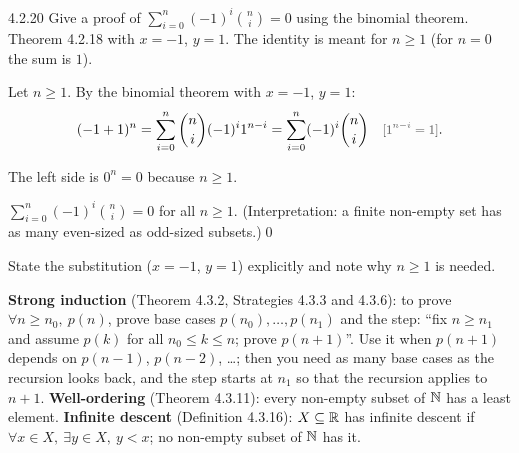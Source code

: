 \begin{bookex}[recommended]{4.2.20}
Give a proof of $\displaystyle\sum_{i=0}^n(-1)^i\binom ni=0$ using the binomial theorem.
\solution
\given Theorem 4.2.18 with $x=-1$, $y=1$. The identity is meant for $n\ge1$ (for $n=0$ the sum is $1$).
\begin{steps}
\item Let $n\ge1$. By the binomial theorem with $x=-1$, $y=1$:
\[
(-1+1)^n=\sum_{i=0}^n\binom ni(-1)^i1^{n-i}=\sum_{i=0}^n(-1)^i\binom ni \why{$1^{n-i}=1$}.
\]
\item The left side is $0^n=0$ because $n\ge1$.
\end{steps}
\conclusion $\sum_{i=0}^n(-1)^i\binom ni=0$ for all $n\ge1$. (Interpretation: a finite non-empty set has as many even-sized as odd-sized subsets.)\qed
\begin{compare}
\item State the substitution ($x=-1$, $y=1$) explicitly and note why $n\ge1$ is needed.
\end{compare}
\end{bookex}


\begin{key}
\textbf{Strong induction} (Theorem 4.3.2, Strategies 4.3.3 and 4.3.6): to prove $\forall n\ge n_0,\ p(n)$, prove base cases $p(n_0),\dots,p(n_1)$ and the step: ``fix $n\ge n_1$ and assume $p(k)$ for all $n_0\le k\le n$; prove $p(n+1)$''. Use it when $p(n+1)$ depends on $p(n-1)$, $p(n-2)$, \dots; then you need as many base cases as the recursion looks back, and the step starts at $n_1$ so that the recursion applies to $n+1$. \textbf{Well-ordering} (Theorem 4.3.11): every non-empty subset of $\mathbb{N}$ has a least element. \textbf{Infinite descent} (Definition 4.3.16): $X\subseteq\mathbb{R}$ has infinite descent if $\forall x\in X,\ \exists y\in X,\ y<x$; no non-empty subset of $\mathbb{N}$ has it.
\end{key}

